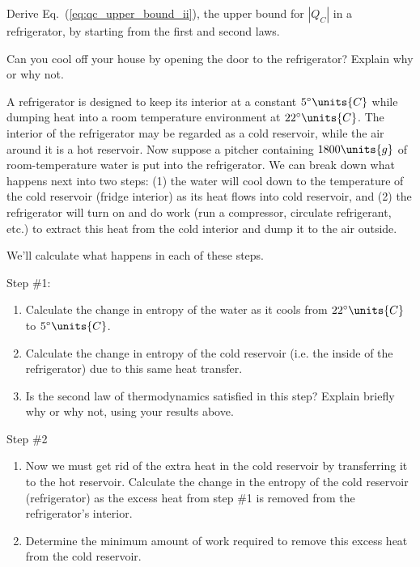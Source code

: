 \begin{problem} 
  Derive Eq.~(\ref{eq:qc_upper_bound_ii}), the upper bound for $|Q_C|$
  in a refrigerator, by starting from the first and second laws.
\end{problem}

\begin{problem}
  Can you cool off your house by opening the door to the refrigerator?
  Explain why or why not.
\end{problem}


\begin{problem} 
 A  refrigerator is designed to  keep its interior  at a constant
  $5^\circ\units{C}$  while  dumping  heat  into  a  room  temperature
  environment at $22^\circ\units{C}$.  The interior of
  the refrigerator may be regarded as a cold reservoir, 
while the air  around it is a
  hot reservoir.  Now suppose  a pitcher containing $1800\units{g}$ of
  room-temperature water  is put into  the refrigerator. We  can break
  down what happens next into two  steps: (1) the water will cool down
  to the  temperature of the  cold reservoir (fridge interior)  as its
  heat flows into  cold reservoir, and (2) the  refrigerator will turn
  on and do  work (run a compressor, circulate  refrigerant, etc.)  to
  extract this  heat from  the cold  interior and dump  it to  the air
  outside.

We'll calculate what happens in each of these steps.

Step \#1:
\begin{enumerate}
\item  Calculate the change in entropy of the water as it cools from 
$22^\circ\units{C}$ to $5^\circ\units{C}$.
\item Calculate the change in entropy of the cold reservoir (i.e. the
inside of the refrigerator) due to this same heat transfer.

\item Is the second law of thermodynamics satisfied in this step?
Explain briefly why or why not, using your results above.
\end{enumerate}

Step \#2
\begin{enumerate}

\item Now we must get rid of the extra heat in the cold reservoir 
  by   transferring  it  to  the  hot  reservoir.
  Calculate the change in the entropy of the cold reservoir
(refrigerator) as the excess heat
  from step \#1 is removed from the refrigerator's interior.

\item  Determine the minimum amount  of work required to remove this 
excess heat
from the cold reservoir. 


\end{enumerate}
\end{problem}


